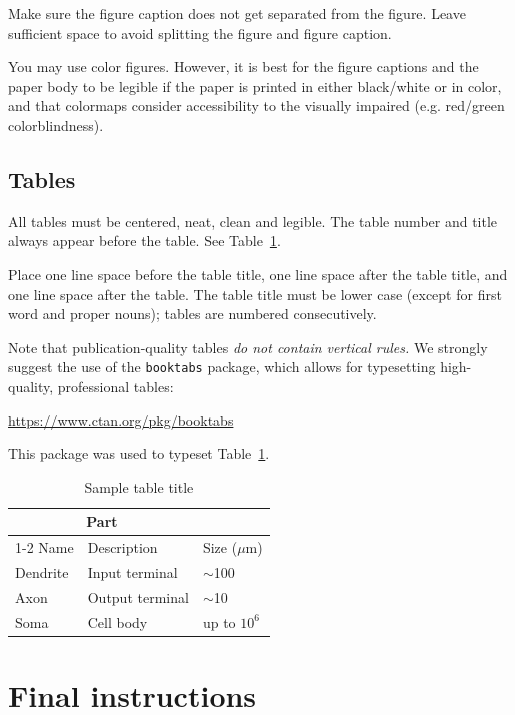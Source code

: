 \documentclass{article}
\begin{document}
Make sure the figure caption does not get separated from the figure. Leave sufficient space to avoid splitting the figure and figure caption.

You may use color figures.  However, it is best for the figure captions and the
paper body to be legible if the paper is printed in either black/white or in
color, and that colormaps consider accessibility to the visually impaired (e.g. red/green colorblindness).

\subsection{Tables}

All tables must be centered, neat, clean and legible.  The table number and
title always appear before the table.  See Table~\ref{sample-table}.

Place one line space before the table title, one line space after the
table title, and one line space after the table. The table title must
be lower case (except for first word and proper nouns); tables are
numbered consecutively.

Note that publication-quality tables \emph{do not contain vertical rules.} We
strongly suggest the use of the \verb+booktabs+ package, which allows for
typesetting high-quality, professional tables:
\begin{center}
  \url{https://www.ctan.org/pkg/booktabs}
\end{center}
This package was used to typeset Table~\ref{sample-table}.

\begin{table}
  \caption{Sample table title}
  \label{sample-table}
  \centering
  \begin{tabular}{lll}
    \toprule
    \multicolumn{2}{c}{Part}                   \\
    \cmidrule(r){1-2}
    Name     & Description     & Size ($\mu$m) \\
    \midrule
    Dendrite & Input terminal  & $\sim$100     \\
    Axon     & Output terminal & $\sim$10      \\
    Soma     & Cell body       & up to $10^6$  \\
    \bottomrule
  \end{tabular}
\end{table}

\section{Final instructions}
\end{document}

